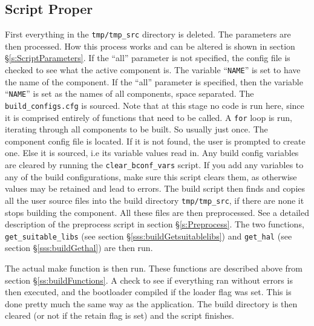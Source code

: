 \documentclass[a4paper, oneside, 11pt, titlepage, onecolumn, openright]{report}
\begin{document}
\subsection{Script Proper}
			\label{sss:buildScriptProper}
			First everything in the \texttt{tmp/tmp\_src} directory is deleted. The parameters are then processed. How this process works and can be altered is shown in section \S\ref{s:ScriptParameters}.\newline
			If the ``all'' parameter is not specified, the config file is checked to see what the active component is. The variable ``\texttt{NAME}'' is set to have the name of the component.\newline
			If the ``all'' parameter is specified, then the variable ``\texttt{NAME}'' is set as the names of all components, space separated.\newline
			The \texttt{build\_configs.cfg} is sourced. Note that at this stage no code is run here, since it is comprised entirely of functions that need to be called.\newline
			A \texttt{for} loop is run, iterating through all components to be built. So usually just once.\newline
			The component config file is located. If it is not found, the user is prompted to create one. Else it is sourced, i.e its variable values read in. Any build config variables are cleared by running the \texttt{clear\_bconf\_vars} script. If you add any variables to any of the build configurations, make sure this script clears them, as otherwise values may be retained and lead to errors.\newline
			The build script then finds and copies all the user source files into the build directory \texttt{tmp/tmp\_src}, if there are none it stops building the component. All these files are then preprocessed. See a detailed description of the preprocess script in section \S\ref{s:Preprocess}.
			The two functions, \texttt{get\_suitable\_libs} (see section \S\ref{sss:buildGetsuitablelibs}) and \texttt{get\_hal} (see section \S\ref{sss:buildGethal}) are then run.
			
			The actual make function is then run. These functions are described above from section \S\ref{ss:buildFunctions}.			
			A check to see if everything ran without errors is then executed, and the bootloader compiled if the loader flag was set. This is done pretty much the same way as the application.
			The build directory is then cleared (or not if the retain flag is set) and the script finishes.
			
\end{document}
